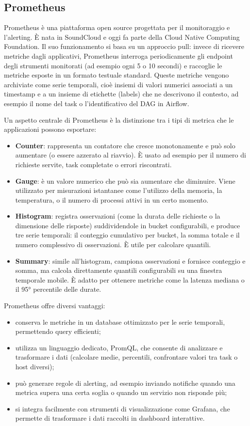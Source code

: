 \subsection{Prometheus}
\label{sec:prometheus}
Prometheus è una piattaforma open source progettata per il monitoraggio e l’alerting. È nata in SoundCloud e oggi fa parte della Cloud Native Computing Foundation.
Il suo funzionamento si basa su un approccio pull: invece di ricevere metriche dagli applicativi, Prometheus interroga periodicamente gli endpoint degli strumenti monitorati (ad esempio ogni 5 o 10 secondi) e raccoglie le metriche esposte in un formato testuale standard.
Queste metriche vengono archiviate come serie temporali, cioè insiemi di valori numerici associati a un timestamp e a un insieme di etichette (labels) che ne descrivono il contesto, ad esempio il nome del task o l’identificativo del DAG in Airflow.

Un aspetto centrale di Prometheus è la distinzione tra i tipi di metrica che le applicazioni possono esportare:

\begin{itemize}
    \item \textbf{Counter}: rappresenta un contatore che cresce monotonamente e può solo aumentare (o essere azzerato al riavvio). È usato ad esempio per il numero di richieste servite, task completate o errori riscontrati.
    \item \textbf{Gauge}: è un valore numerico che può sia aumentare che diminuire. Viene utilizzato per misurazioni istantanee come l’utilizzo della memoria, la temperatura, o il numero di processi attivi in un certo momento.
    \item \textbf{Histogram}: registra osservazioni (come la durata delle richieste o la dimensione delle risposte) suddividendole in bucket configurabili, e produce tre serie temporali: il conteggio cumulativo per bucket, la somma totale e il numero complessivo di osservazioni. È utile per calcolare quantili.
    \item \textbf{Summary}: simile all’histogram, campiona osservazioni e fornisce conteggio e somma, ma calcola direttamente quantili configurabili su una finestra temporale mobile. È adatto per ottenere metriche come la latenza mediana o il 95° percentile delle durate.
\end{itemize}

Prometheus offre diversi vantaggi:
\begin{itemize}
    \item conserva le metriche in un database ottimizzato per le serie temporali, permettendo query efficienti;
    \item utilizza un linguaggio dedicato, PromQL, che consente di analizzare e trasformare i dati (calcolare medie, percentili, confrontare valori tra task o host diversi);
    \item può generare regole di alerting, ad esempio inviando notifiche quando una metrica supera una certa soglia o quando un servizio non risponde più;
    \item si integra facilmente con strumenti di visualizzazione come Grafana, che permette di trasformare i dati raccolti in dashboard interattive.
\end{itemize}

